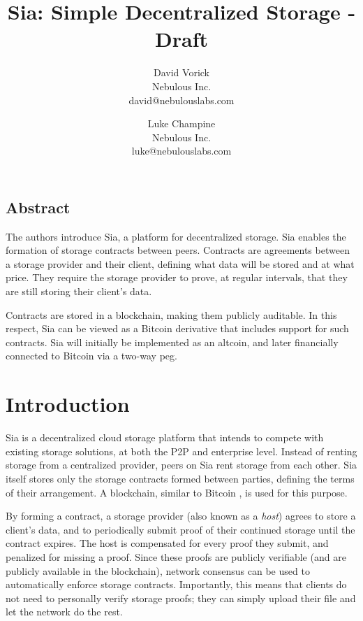\documentclass[twocolumn]{article}
\begin{document}
\frenchspacing

\title{Sia: Simple Decentralized Storage - Draft}

\author{
{\rm David Vorick}\\
Nebulous Inc.\\
david@nebulouslabs.com
\and
{\rm Luke Champine}\\
Nebulous Inc.\\
luke@nebulouslabs.com
}

\maketitle

\subsection*{Abstract}
The authors introduce Sia, a platform for decentralized storage.
Sia enables the formation of storage contracts between peers.
Contracts are agreements between a storage provider and their client, defining what data will be stored and at what price.
They require the storage provider to prove, at regular intervals, that they are still storing their client's data.

Contracts are stored in a blockchain, making them publicly auditable.
In this respect, Sia can be viewed as a Bitcoin derivative that includes support for such contracts.
Sia will initially be implemented as an altcoin, and later financially connected to Bitcoin via a two-way peg.

\section{Introduction}
Sia is a decentralized cloud storage platform that intends to compete with existing storage solutions, at both the P2P and enterprise level.
Instead of renting storage from a centralized provider, peers on Sia rent storage from each other.
Sia itself stores only the storage contracts formed between parties, defining the terms of their arrangement.
A blockchain, similar to Bitcoin \cite{btc, btcdg}, is used for this purpose.

By forming a contract, a storage provider (also known as a \textit{host}) agrees to store a client's data, and to periodically submit proof of their continued storage until the contract expires.
The host is compensated for every proof they submit, and penalized for missing a proof.
Since these proofs are publicly verifiable (and are publicly available in the blockchain), network consensus can be used to automatically enforce storage contracts.
Importantly, this means that clients do not need to personally verify storage proofs; they can simply upload their file and let the network do the rest.
\end{document}
